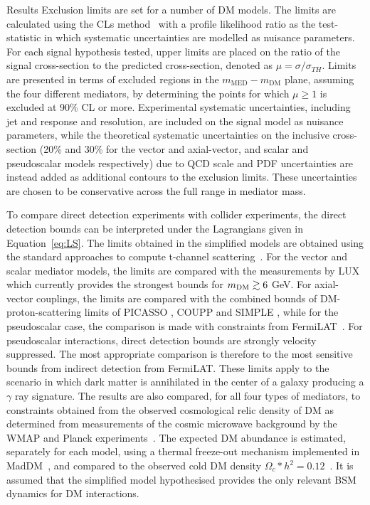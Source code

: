 \begin{section}{Results}
Exclusion limits are set for a number of DM models. The limits are calculated using the CLs method~\cite{cls} with a profile likelihood ratio as the 
test-statistic in which systematic uncertainties are modelled as nuisance parameters. 
For each signal hypothesis tested, upper limits are placed on the ratio of 
the signal cross-section to the predicted cross-section, denoted as $\mu=\sigma/\sigma_{TH}$. Limits are presented in terms of excluded regions in the 
$m_{\mathrm{MED}}-m_{\textrm{DM}}$ plane, assuming the four different mediators, by determining the points for which $\mu\ge1$ is excluded at 90\% CL or more.
Experimental systematic uncertainties, including jet and \ETm response and resolution, are included on the signal model as nuisance parameters, while the
theoretical systematic uncertainties on the inclusive cross-section (20\% and 30\% for the vector and axial-vector, and scalar and pseudoscalar models respectively) due to QCD scale and 
PDF uncertainties are instead added as additional contours to the exclusion limits. These uncertainties are chosen to be conservative across the full range in mediator mass.


To compare direct detection experiments with collider experiments, the direct detection bounds can be interpreted under the Lagrangians given in Equation~\ref{eq:LS}. The limits obtained in 
the simplified models are obtained using the standard approaches to compute t-channel scattering~\cite{Kurylov:2003ra,Hisano:2010ct, Cheung:2013pfa}. 
For the vector and scalar mediator models, the limits are compared with the measurements by LUX~\cite{Akerib:2012ys,Akerib:2013tjd,Szydagis:2014xog} which currently 
provides the strongest bounds for $m_{\rm DM} \gtrsim 6$ GeV. For axial-vector couplings, the limits are compared with the combined bounds 
of DM-proton-scattering limits of PICASSO \cite{Archambault:2012pm}, COUPP \cite{Behnke:2012ys} and SIMPLE \cite{Felizardo:2011uw}, while for the pseudoscalar case, the comparison is made 
with constraints from FermiLAT~\cite{Ackermann:2011wa,Abdo:2010ex}.
For pseudoscalar interactions, direct detection bounds are strongly velocity suppressed. 
The most appropriate comparison is therefore to the most sensitive bounds from indirect detection from FermiLAT. 
These limits apply to the scenario in which dark matter is annihilated in the center of a galaxy producing a $\gamma$ ray signature. 
The results are also compared, for all four types of mediators, to constraints obtained from the observed cosmological relic density of DM as determined from 
measurements of the cosmic microwave background by the WMAP and Planck experiments~\cite{Bennett:2003ba,Planck:2006aa}. The expected DM abundance is estimated, separately for each
model, using a thermal freeze-out mechanism implemented in MadDM~\cite{Backovic:2013dpa}, and compared to the observed cold DM density $\Omega_c*h^2=0.12$~\cite{Ade:2013zuv}. 
It is assumed that the simplified model hypothesised provides the only relevant BSM dynamics for DM interactions.


\end{section}
